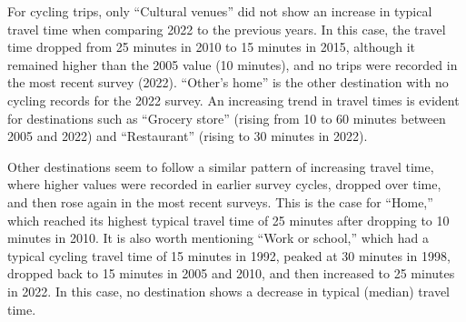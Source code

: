 \documentclass[preprint, 3p,
authoryear]{elsarticle} %
\begin{document}
For cycling trips, only ``Cultural venues'' did not show an increase in
typical travel time when comparing 2022 to the previous years. In this
case, the travel time dropped from 25 minutes in 2010 to 15 minutes in
2015, although it remained higher than the 2005 value (10 minutes), and
no trips were recorded in the most recent survey (2022). ``Other's
home'' is the other destination with no cycling records for the 2022
survey. An increasing trend in travel times is evident for destinations
such as ``Grocery store'' (rising from 10 to 60 minutes between 2005 and
2022) and ``Restaurant'' (rising to 30 minutes in 2022).

Other destinations seem to follow a similar pattern of increasing travel
time, where higher values were recorded in earlier survey cycles,
dropped over time, and then rose again in the most recent surveys. This
is the case for ``Home,'' which reached its highest typical travel time
of 25 minutes after dropping to 10 minutes in 2010. It is also worth
mentioning ``Work or school,'' which had a typical cycling travel time
of 15 minutes in 1992, peaked at 30 minutes in 1998, dropped back to 15
minutes in 2005 and 2010, and then increased to 25 minutes in 2022. In
this case, no destination shows a decrease in typical (median) travel
time.
\end{document}
